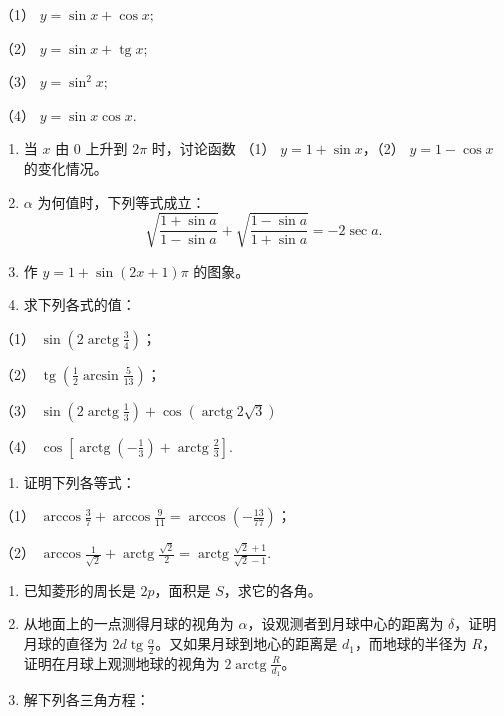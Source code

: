 （1） \(y = \sin x + \cos x;\)

（2） \(y = \sin x + \operatorname{tg} x;\)

（3） \(y = \sin^2 x;\)

（4） \(y = \sin x \cos x.\)

\begin{enumerate}[start=52]
\item
  当 \(x\) 由 0 上升到 \(2\pi\) 时，讨论函数 （1）
  \(y = 1 + \sin x\)，（2） \(y = 1 - \cos x\) 的变化情况。
\item
  \(\alpha\) 为何值时，下列等式成立：
\[
\sqrt {\frac {1 + \sin a}{1 - \sin a}} + \sqrt {\frac {1 - \sin a}{1 + \sin a}} = - 2 \sec a.
\]
\item
  作 \(y = 1 + \sin (2x + 1)\pi\) 的图象。
\item
  求下列各式的值：
\end{enumerate}

（1） \(\sin \left(2\operatorname{arctg} \frac{3}{4}\right)\)；

（2）
\(\operatorname{tg}\left(\frac{1}{2}\arcsin \frac{5}{13}\right)\)；

（3）
\(\sin \left(2\operatorname{arctg} \frac{1}{3}\right) + \cos (\operatorname{arctg} 2\sqrt{3})\)

（4）
\(\cos \left[\operatorname{arctg}\left(-\frac{1}{3}\right) + \operatorname{arctg} \frac{2}{3}\right]\).

\begin{enumerate}[start=56]
\item
  证明下列各等式：
\end{enumerate}

（1）
\(\arccos \frac{3}{7} + \arccos \frac{9}{11} = \arccos \left(-\frac{13}{77}\right)\)；

（2）
\(\arccos \frac{1}{\sqrt{2}} + \operatorname{arctg} \frac{\sqrt{2}}{2} = \operatorname{arctg} \frac{\sqrt{2} + 1}{\sqrt{2} - 1}\).

\begin{enumerate}[start=57]
\item
  已知菱形的周长是 \(2p\)，面积是 \(S\)，求它的各角。
\item
  从地面上的一点测得月球的视角为 \(\alpha\)，设观测者到月球中心的距离为
  \(\delta\)，证明月球的直径为
  \(2d \operatorname{tg} \frac{\alpha}{2}\)。又如果月球到地心的距离是
  \(d_1\)，而地球的半径为 \(R\)，证明在月球上观测地球的视角为
  \(2 \operatorname{arctg} \frac{R}{d_1}\)。
\item
  解下列各三角方程：
\end{enumerate}

